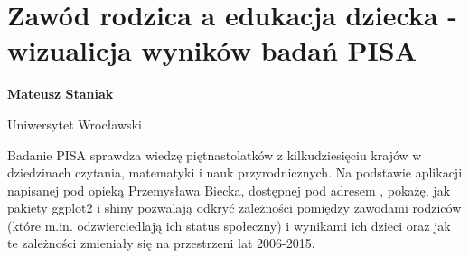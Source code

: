 \documentclass[\main/boa.tex]{subfiles}
\begin{document}
\section{Zawód rodzica a edukacja dziecka - wizualicja wyników badań PISA}

\begin{minipage}{0.915\textwidth}
	\centering
  {\bf {} Mateusz Staniak}
\end{minipage}

\vskip 0.3cm

\begin{affiliations}
\begin{minipage}{0.915\textwidth}
\centering
Uniwersytet Wrocławski \\[-2pt]
\end{minipage}
\end{affiliations}

\vskip 0.8cm

 Badanie PISA sprawdza wiedzę piętnastolatków z kilkudziesięciu krajów w dziedzinach czytania, matematyki i nauk przyrodnicznych. Na podstawie aplikacji napisanej pod opieką Przemysława Biecka, dostępnej pod adresem , pokażę, jak pakiety ggplot2 i shiny pozwalają odkryć zależności pomiędzy zawodami rodziców (które m.in. odzwierciedlają ich status społeczny) i wynikami ich dzieci oraz jak te zależności zmieniały się na przestrzeni lat 2006-2015.
\end{document}
